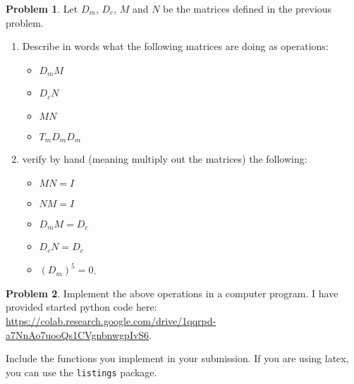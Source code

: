 \documentclass[12pt]{article}
\theoremstyle{definition}
\newtheorem{problem}{Problem}
\begin{document}
\begin{problem}
    Let $D_m$, $D_c$, $M$ and $N$ be the matrices defined in the previous problem.
    \begin{enumerate}
        \item Describe in words what the following matrices are doing as operations:
        \begin{itemize}
            \item $D_m M$
            \item $D_c N$
            \item $M N$
            \item $T_m D_m D_m$
        \end{itemize}
        \item verify by hand (meaning multiply out the matrices) the following:
        \begin{itemize}
            \item $M N = I$
            \item $N M = I$
            \item $D_m M = D_c$
            \item $D_c N = D_c$
            \item $(D_m)^5 = 0$.
        \end{itemize}
    \end{enumerate}

\end{problem}

\begin{problem}
    Implement the above operations in a computer program. 
    I have provided started python code here: \url{https://colab.research.google.com/drive/1qqrpd-a7NnAo7uooQs1CVgnbnwgpIvS6}.

    Include the functions you implement in your submission.
    If you are using latex, you can use the \texttt{listings} package.
\end{problem}
\end{document}
